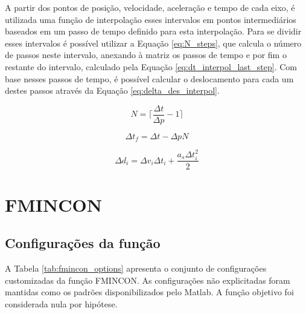 A partir dos pontos de posição, velocidade, aceleração e tempo de cada eixo, é utilizada uma função de interpolação esses intervalos em pontos intermediários baseados em um passo de tempo definido para esta interpolação. Para se dividir esses intervalos é possível utilizar a Equação \ref{eq:N_steps}, que calcula o número de passos neste intervalo, anexando à matriz os passos de tempo e por fim o restante do intervalo, calculado pela Equação \ref{eq:dt_interpol_last_step}. Com base nesses passos de tempo, é possível calcular o deslocamento para cada um destes passos através da Equação \ref{eq:delta_des_interpol}.

\begin{equation}
    \label{eq:N_steps}
    N = \lceil\frac{\Delta t}{\Delta p}-1\rceil
\end{equation}

\begin{equation}
    \label{eq:dt_interpol_last_step}
    \Delta t_f= \Delta t - \Delta p N 
\end{equation}

\begin{equation}
    \label{eq:delta_des_interpol}
    \Delta d_i = \Delta v_i \Delta t_i+ \frac{a_s \Delta t_i^2}{2} 
\end{equation}



\section{FMINCON}

\subsection{Configurações da função}

A Tabela \ref{tab:fmincon_options} apresenta o conjunto de configurações customizadas da função FMINCON. As configurações não explicitadas foram mantidas como os padrões disponibilizados pelo Matlab. A função objetivo foi considerada nula por hipótese.

